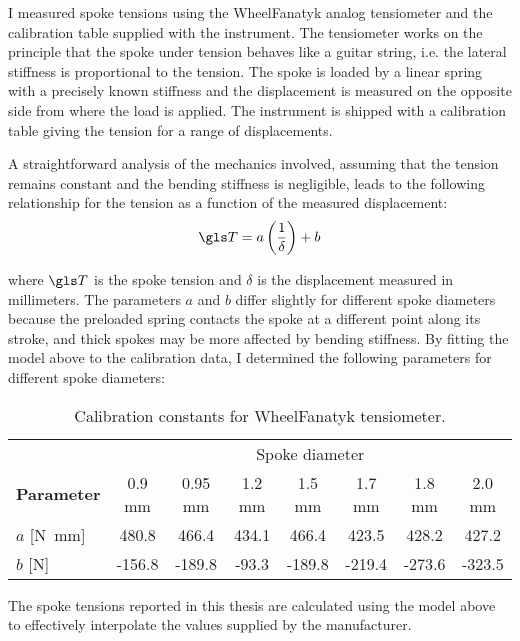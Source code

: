 \documentclass[../../thesis.tex]{subfiles}
\begin{document}
I measured spoke tensions using the WheelFanatyk analog tensiometer and the calibration table supplied with the instrument. The tensiometer works on the principle that the spoke under tension behaves like a guitar string, i.e. the lateral stiffness is proportional to the tension. The spoke is loaded by a linear spring with a precisely known stiffness and the displacement is measured on the opposite side from where the load is applied. The instrument is shipped with a calibration table giving the tension for a range of displacements.

A straightforward analysis of the mechanics involved, assuming that the tension remains constant and the bending stiffness is negligible, leads to the following relationship for the tension as a function of the measured displacement:
\begin{equation}
\T = a\left(\frac{1}{\delta}\right) + b
\end{equation}

where $\T$ is the spoke tension and $\delta$ is the displacement measured in millimeters. The parameters $a$ and $b$ differ slightly for different spoke diameters because the preloaded spring contacts the spoke at a different point along its stroke, and thick spokes may be more affected by bending stiffness. By fitting the model above to the calibration data, I determined the following parameters for different spoke diameters:

\begin{table}[h]
\caption[Calibration constants for WheelFanatyk tensiometer]{Calibration constants for WheelFanatyk tensiometer.}
\begin{tabular}{lccccccc}
\toprule
&\multicolumn{7}{c}{Spoke diameter}\\
\cmidrule(r){2-8}
\bf Parameter & 0.9 mm & 0.95 mm & 1.2 mm & 1.5 mm & 1.7 mm & 1.8 mm & 2.0 mm\\
\midrule
$a$ [\si{N.mm}] &  480.8 &  466.4 & 434.1 &  466.4 &  423.5 &  428.2 &  427.2\\
$b$ [\si{N}]    & -156.8 & -189.8 & -93.3 & -189.8 & -219.4 & -273.6 & -323.5\\
\bottomrule
\end{tabular}
\end{table}

The spoke tensions reported in this thesis are calculated using the model above to effectively interpolate the values supplied by the manufacturer.
\end{document}
